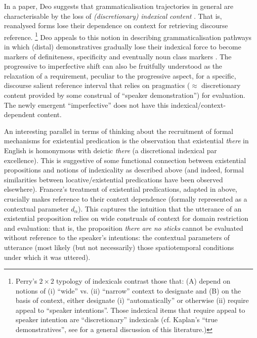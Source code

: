 \documentclass[output=paper]{langsci/langscibook}
\begin{document}
In a \citeyear{Deo2018} paper, Deo suggests that grammaticalisation
trajectories in general are characterisable by the loss of
\textit{(discretionary) indexical content} \citep[e.g.][68ff]{Perry2012}.
That is, reanalysed forms lose their dependence on context for retrieving
discourse reference.%
%
\footnote{Perry's \citeyearpar[68ff]{Perry2012} $2\times 2${} typology of indexicals contrast those that: (A) depend on notions of (i) ``wide'' vs. (ii) ``narrow'' context to designate and (B) on the basis of context, either designate (i) ``automatically'' or otherwise (ii) require appeal to ``speaker intentions''. Those indexical items that require appeal to speaker intention are ``discretionary'' indexicals (cf. Kaplan's ``true demonstratives'', see \cite{Braun2017} for a general discussion of this literature.)} 
%
Deo appeals to this notion in describing grammaticalisation pathways in which (distal) demonstratives gradually lose their indexical force to become markers of definiteness, specificity and eventually noun class markers \citep[see also][61]{Greenberg1978,deMulder2011,Stevens2007}. The progressive to imperfective shift can also be fruitfully understood as the relaxation of a requirement, peculiar to the progressive aspect, for a specific, discourse salient reference interval that relies on pragmatics ($\approx$ discretionary content provided by some construal of ``speaker demonstration'') for evaluation. The newly emergent ``imperfective'' does not have this indexical\slash context-dependent content.

An interesting parallel in terms of thinking about the recruitment of
formal mechanisms for existential predication is the observation that
existential \textit{there} in English is homonymous with deictic
\textit{there} (a discretional indexical par excellence). This is
suggestive of some functional connection between existential propositions
and notions of indexicality as described above (and indeed, formal
similarities between locative\slash existential predications have been
observed elsewhere). Francez's \citeyear{Francez2007} treatment of
existential predications, adapted in
 above, crucially makes
reference to their context dependence (formally represented as a contextual
parameter $d_\alpha$). This captures the intuition that the utterance of an existential proposition relies on wide construals of context for domain restriction and evaluation: that is, the proposition \textit{there are no sticks} cannot be evaluated without reference to the speaker's intentions: the contextual parameters of utterance (most likely (but not necessarily) those spatiotemporal conditions under which it was uttered). 
\end{document}
